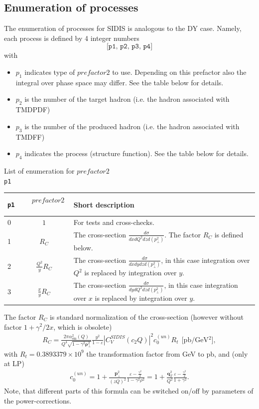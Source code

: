 \documentclass[prd,nofootinbib,eqsecnum,final]{revtex4}
\renewcommand{\(}{\left(}
\renewcommand{\)}{\right)}
\renewcommand{\[}{\left[}
\renewcommand{\]}{\right]}
\renewcommand{\vec}[1]{\bm{#1}}
\begin{document}
\subsection{Enumeration of processes}

The enumeration of processes for SIDIS is analogous to the DY case. Namely, each process is defined by 4 integer numbers
$$\texttt{[p1, p2, p3, p4]}$$
with
\begin{itemize}
\item $p_1$ indicates type of $prefactor2$ to use. Depending on this prefactor also the integral over phase space may differ. See the table below for details.
\item $p_2$ is the number of the target hadron (i.e. the hadron associated with TMDPDF)
\item $p_3$ is the number of the produced hadron (i.e. the hadron associated with TMDFF)
\item $p_4$ indicates the process (structure function). See the table below for details.
\end{itemize}

\begin{center}
List of enumeration for $prefactor2$
\\
\texttt{p1}
\\
\begin{tabular}{||l|c||p{12cm}||}
\hline\hline
\texttt{p1} & ~~$prefactor2$~~&  Short description 
\\\hline
0 & $1$ & For tests and cross-checks.
\\\hline
1 & $R_C$ & The cross-section $\frac{d\sigma}{dx dQ^2 dz d(p_\perp^2)}$. The factor $R_C$ is defined below.
\\\hline
2 & $\frac{Q^2}{y} R_C$& The cross-section $\frac{d\sigma}{dx dy dz d(p_\perp^2)}$, in this case integration over $Q^2$ is replaced by integration over $y$.
\\\hline
3 & $\frac{x}{y} R_C$ & The cross-section $\frac{d\sigma}{dy dQ^2 dz d(p_\perp^2)}$, in this case integration over $x$ is replaced by integration over $y$.
\\\hline\hline
\end{tabular}
\end{center}
The factor $R_C$ is standard normalization of the cross-section (however without factor $1+\gamma^2/2x$, which is obsolete)
\begin{eqnarray}
R_C=\frac{2\pi \alpha_{\text{em}}^2(Q)}{Q^4\sqrt{1-\gamma^2 \vec \rho_\perp^2}}\frac{y^2}{1-\varepsilon}|C_V^{SIDIS}(c_2Q)|^2 c^{(un)}_0 R_t~~\text{[pb/GeV$^2$]},
\end{eqnarray}
with $R_t=0.3893379\times 10^9$ the transformation factor from GeV to pb, and (only at LP)
\begin{eqnarray}\label{SIDIS:c0un}
c_0^{(un)}=1+\frac{\vec p_\perp^2}{(zQ)^2}\frac{\varepsilon-\frac{\gamma^2}{2}}{1-\gamma^2\rho^2}
=1+\frac{\vec q_T^2}{Q^2}\frac{\varepsilon-\frac{\gamma^2}{2}}{1+\gamma^2}
.
\end{eqnarray}
Note, that different parts of this formula can be switched on/off by parameters of the power-corrections.
\end{document}
